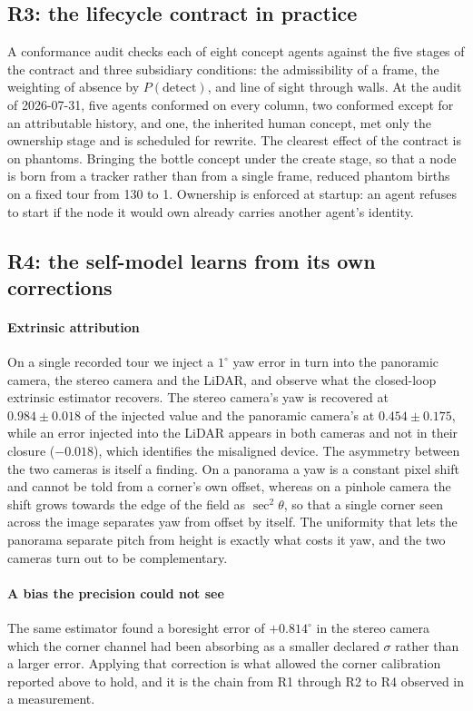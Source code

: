 \documentclass[10pt,twocolumn]{IEEEtran}
\newcommand{\pdet}{\ensuremath{P(\mathrm{detect})}}
\begin{document}
\subsection{R3: the lifecycle contract in practice}\label{sec:eval:r3}

A conformance audit checks each of eight concept agents against the five stages of the contract and
three subsidiary conditions: the admissibility of a frame, the weighting of absence by \pdet, and line
of sight through walls. At the audit of 2026-07-31, five agents conformed on every column, two
conformed except for an attributable history, and one, the inherited human concept, met only the
ownership stage and is scheduled for rewrite. The clearest effect of the contract is on phantoms.
Bringing the bottle concept under the create stage, so that a node is born from a tracker rather than
from a single frame, reduced phantom births on a fixed tour from \num{130} to \num{1}. Ownership is
enforced at startup: an agent refuses to start if the node it would own already carries another
agent's identity.

\subsection{R4: the self-model learns from its own corrections}\label{sec:eval:r4}

\paragraph{Extrinsic attribution} On a single recorded tour we inject a $1^\circ$ yaw error in turn
into the panoramic camera, the stereo camera and the LiDAR, and observe what the closed-loop extrinsic
estimator recovers. The stereo camera's yaw is recovered at $0.984 \pm 0.018$ of the injected value
and the panoramic camera's at $0.454 \pm 0.175$, while an error injected into the LiDAR appears in
both cameras and not in their closure ($-0.018$), which identifies the misaligned device. The
asymmetry between the two cameras is itself a finding. On a panorama a yaw is a constant pixel shift
and cannot be told from a corner's own offset, whereas on a pinhole camera the shift grows towards the
edge of the field as $\sec^2\theta$, so that a single corner seen across the image separates yaw from
offset by itself. The uniformity that lets the panorama separate pitch from height is exactly what
costs it yaw, and the two cameras turn out to be complementary.

\paragraph{A bias the precision could not see} The same estimator found a boresight error of
$+0.814^\circ$ in the stereo camera which the corner channel had been absorbing as a smaller declared
$\sigma$ rather than a larger error. Applying that correction is what allowed the corner calibration
reported above to hold, and it is the chain from R1 through R2 to R4 observed in a measurement.
\end{document}
